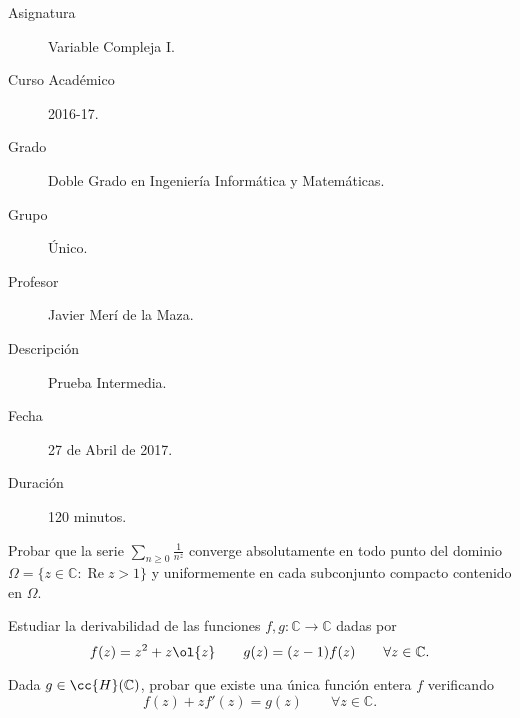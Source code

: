 \documentclass[12pt]{article}
\renewcommand{\Re}{\operatorname{Re}} %
\begin{document}

    
    

    \begin{description}
        \item[Asignatura] Variable Compleja I.
        \item[Curso Académico] 2016-17.
        \item[Grado] Doble Grado en Ingeniería Informática y Matemáticas.
        \item[Grupo] Único.
        \item[Profesor] Javier Merí de la Maza.
        \item[Descripción] Prueba Intermedia.
        \item[Fecha] 27 de Abril de 2017.
        \item[Duración] 120 minutos.
    \end{description}
    \newpage

    \begin{ejercicio}[3.5 puntos]
        Probar que la serie $\sum\limits_{n \geq 0} \frac{1}{n^z}$ converge absolutamente en todo punto del dominio $\Omega = \{z \in \mathbb{C} : \Re z > 1\}$ y uniformemente en cada subconjunto compacto contenido en $\Omega$.
    \end{ejercicio}

    \begin{ejercicio}[3 puntos]
        Estudiar la derivabilidad de las funciones $f , g : \mathbb{C} \to \mathbb{C}$ dadas por
        \[
            f(z) = z^2+z\ol{z} \qquad g(z) = (z - 1) f(z) \qquad \forall z \in \mathbb{C}.
        \]
    \end{ejercicio}

    \begin{ejercicio}[3.5 puntos]
        Dada $g \in \cc{H} (\mathbb{C})$, probar que existe una única función entera $f$ verificando
        \begin{equation*}
            f(z) + z f'(z) = g(z) \qquad \forall z \in \mathbb{C}.
        \end{equation*}
    \end{ejercicio}
\end{document}
